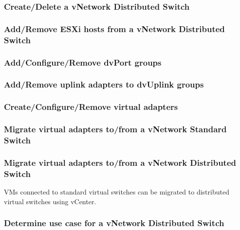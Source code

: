\subsubsection{Create/Delete a vNetwork Distributed Switch}

\subsubsection{Add/Remove ESXi hosts from a vNetwork Distributed Switch}

\subsubsection{Add/Configure/Remove dvPort groups}

\subsubsection{Add/Remove uplink adapters to dvUplink groups}

\subsubsection{Create/Configure/Remove virtual adapters}

\subsubsection{Migrate virtual adapters to/from a vNetwork Standard Switch}

\subsubsection{Migrate virtual adapters to/from a vNetwork Distributed Switch}

VMs connected to standard virtual switches can be migrated to distributed
virtual switches using vCenter.

\subsubsection{Determine use case for a vNetwork Distributed Switch}
